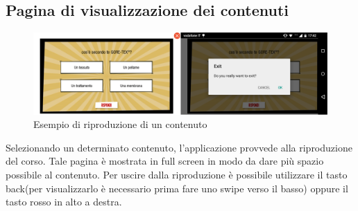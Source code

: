 	\subsection{Pagina di visualizzazione dei contenuti}
	\begin{figure}[H]
		\centering
		\includegraphics[scale=0.1]{images/prodotto_finale/content_tot}
			\caption{Esempio di riproduzione di un contenuto}
	\end{figure}
	Selezionando un determinato contenuto, l'applicazione provvede alla riproduzione del corso. Tale pagina è mostrata in full screen in modo da dare più spazio possibile al contenuto. Per uscire dalla riproduzione è possibile utilizzare il tasto back(per visualizzarlo è necessario prima fare uno swipe verso il basso) oppure il tasto rosso in alto a destra.
